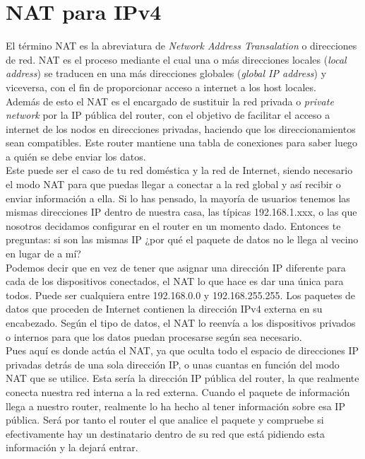 \documentclass[
	12pt, %
	fleqn, %
	a4paper, %
	oneside, %
]{LegrandOrangeBook}
\begin{document}
\section{NAT para IPv4}
El término NAT es la abreviatura de \textit{Network Address Transalation} o direcciones de red. NAT es el proceso mediante el cual una o más direcciones locales (\textit{local address}) se traducen en una más direcciones globales (\textit{global IP address}) y viceversa, con el fin de proporcionar acceso a internet a los host locales.\\
Además de esto el NAT es el encargado de sustituir la red privada o \textit{private network} por la IP pública del router, con el objetivo de facilitar el acceso a internet de los nodos en direcciones privadas, haciendo que los direccionamientos sean compatibles. Este router mantiene una tabla de conexiones para saber luego a quién se debe enviar los datos.\\
Este puede ser el caso de tu red doméstica y la red de Internet, siendo necesario el modo NAT para que puedas llegar a conectar a la red global y así recibir o enviar información a ella. Si lo has pensado, la mayoría de usuarios tenemos las mismas direcciones IP dentro de nuestra casa, las típicas 192.168.1.xxx, o las que nosotros decidamos configurar en el router en un momento dado. Entonces te preguntas: si son las mismas IP ¿por qué el paquete de datos no le llega al vecino en lugar de a mí?\\
Podemos decir que en vez de tener que asignar una dirección IP diferente para cada de los dispositivos conectados, el NAT lo que hace es dar una única para todos. Puede ser cualquiera entre 192.168.0.0 y 192.168.255.255. Los paquetes de datos que proceden de Internet contienen la dirección IPv4 externa en su encabezado. Según el tipo de datos, el NAT lo reenvía a los dispositivos privados o internos para que los datos puedan procesarse según sea necesario.\\
Pues aquí es donde actúa el NAT, ya que oculta todo el espacio de direcciones IP privadas detrás de una sola dirección IP, o unas cuantas en función del modo NAT que se utilice. Esta sería la dirección IP pública del router, la que realmente conecta nuestra red interna a la red externa. Cuando el paquete de información llega a nuestro router, realmente lo ha hecho al tener información sobre esa IP pública. Será por tanto el router el que analice el paquete y compruebe si efectivamente hay un destinatario dentro de su red que está pidiendo esta información y la dejará entrar.
\end{document}
